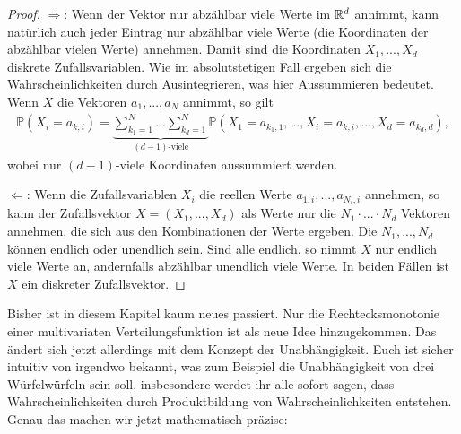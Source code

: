 \begin{proof}
\glqq $\Rightarrow$\grqq: 
Wenn der Vektor nur abz\"ahlbar viele Werte im $\mathbb{R}^d$ annimmt, kann nat\"urlich auch jeder Eintrag nur abz\"ahlbar viele Werte (die Koordinaten der abz\"ahlbar vielen Werte) annehmen. Damit sind die Koordinaten $X_1,...,X_d$ diskrete Zufallsvariablen. Wie im absolutstetigen Fall ergeben sich die Wahrscheinlichkeiten durch Ausintegrieren, was hier Aussummieren bedeutet. Wenn $X$ die Vektoren $a_1,...,a_N$ annimmt, so gilt
\begin{align*}
	\mathbb{P}(X_i=a_{k,i}) =\underbrace{\sum_{k_1=1}^N...\sum_{k_d=1}^N}_{(d-1)\text{-viele}} \mathbb{P}(X_1=a_{k_1,1},..., X_i=a_{k,i},..., X_d = a_{k_d,d}),
\end{align*}
wobei nur $(d-1)$-viele Koordinaten aussummiert werden. 

\glqq $\Leftarrow$\grqq: Wenn die Zufallsvariablen $X_i$ die reellen Werte $a_{1,i},...,a_{N_i,i}$ annehmen, so kann der Zufallsvektor $X=(X_1,...,X_d)$ als Werte nur die  $N_1\cdot ...\cdot N_d$ Vektoren annehmen, die sich aus den Kombinationen der Werte ergeben. Die $N_1,...,N_d$ k\"onnen endlich oder unendlich sein. Sind alle endlich, so nimmt $X$ nur endlich viele Werte an, andernfalls abz\"ahlbar unendlich viele Werte. In beiden F\"allen ist $X$ ein diskreter Zufallsvektor.
\end{proof}
\marginpar{\textcolor{red}{Vorlesung 21}}
Bisher ist in diesem Kapitel kaum neues passiert. Nur die Rechtecksmonotonie einer multivariaten Verteilungsfunktion ist als neue Idee hinzugekommen. Das \"andert sich jetzt allerdings mit dem Konzept der Unabh\"angigkeit. Euch ist sicher intuitiv von irgendwo bekannt, was zum Beispiel die Unabh\"angigkeit von drei W\"urfelw\"urfeln sein soll, insbesondere werdet ihr alle sofort sagen, dass Wahrscheinlichkeiten durch Produktbildung von Wahrscheinlichkeiten entstehen. Genau das machen wir jetzt mathematisch pr\"azise:

